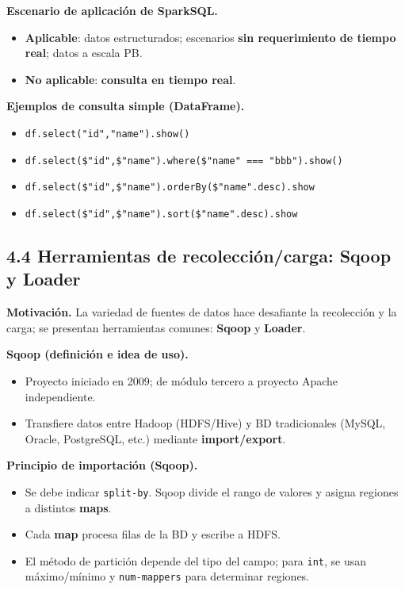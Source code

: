 \documentclass[8pt,a4paper,twocolumn]{article}
\begin{document}
\textbf{Escenario de aplicación de SparkSQL.}
\begin{itemize}
\item \textbf{Aplicable}: datos estructurados; escenarios \textbf{sin requerimiento de tiempo real}; datos a escala PB.
\item \textbf{No aplicable}: \textbf{consulta en tiempo real}.
\end{itemize}

\textbf{Ejemplos de consulta simple (DataFrame).}
\begin{itemize}
\item \texttt{df.select("id","name").show()}
\item \texttt{df.select(\$"id",\$"name").where(\$"name" === "bbb").show()}
\item \texttt{df.select(\$"id",\$"name").orderBy(\$"name".desc).show}
\item \texttt{df.select(\$"id",\$"name").sort(\$"name".desc).show}
\end{itemize}

\subsection{4.4 Herramientas de recolección/carga: Sqoop y Loader}
\textbf{Motivación.} La variedad de fuentes de datos hace desafiante la recolección y la carga; se presentan herramientas comunes: \textbf{Sqoop} y \textbf{Loader}.

\textbf{Sqoop (definición e idea de uso).}
\begin{itemize}
\item Proyecto iniciado en 2009; de módulo tercero a proyecto Apache independiente.
\item Transfiere datos entre Hadoop (HDFS/Hive) y BD tradicionales (MySQL, Oracle, PostgreSQL, etc.) mediante \textbf{import/export}.
\end{itemize}

\textbf{Principio de importación (Sqoop).}
\begin{itemize}
\item Se debe indicar \texttt{split-by}. Sqoop divide el rango de valores y asigna regiones a distintos \textbf{maps}.
\item Cada \textbf{map} procesa filas de la BD y escribe a HDFS.
\item El método de partición depende del tipo del campo; para \texttt{int}, se usan máximo/mínimo y \texttt{num-mappers} para determinar regiones.
\end{itemize}
\end{document}
